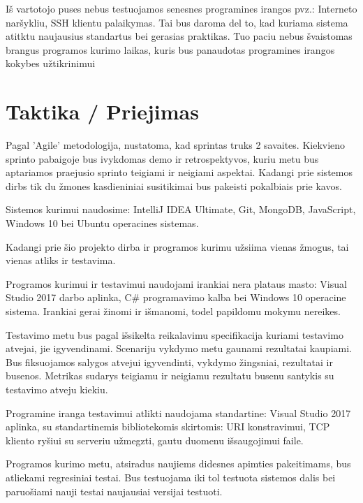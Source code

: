 \documentclass{VUMIFPSkursinis}
\begin{document}
Iš vartotojo puses nebus testuojamos senesnes programines irangos pvz.: Interneto naršykliu, SSH klientu palaikymas.
Tai bus daroma del to, kad kuriama sistema atitktu naujausius standartus bei gerasias praktikas.
Tuo paciu nebus švaistomas brangus programos kurimo laikas, kuris bus panaudotas programines irangos kokybes užtikrinimui


\section{Taktika / Priejimas}

Pagal 'Agile' metodologija, nustatoma, kad sprintas truks 2 savaites.
Kiekvieno sprinto pabaigoje bus ivykdomas demo ir retrospektyvos,
kuriu metu bus aptariamos praejusio sprinto teigiami ir neigiami aspektai.
Kadangi prie sistemos dirbs tik du žmones kasdieniniai susitikimai bus pakeisti pokalbiais prie kavos.

Sistemos kurimui naudosime: IntelliJ IDEA Ultimate, Git, MongoDB, JavaScript, Windows 10 bei Ubuntu operacines sistemas.













Kadangi prie šio projekto dirba ir programos kurimu užsiima vienas žmogus, tai vienas atliks ir testavima.

Programos kurimui ir testavimui naudojami irankiai nera plataus masto: Visual Studio 2017 darbo aplinka, C\# programavimo kalba bei Windows 10 operacine sistema. 
Irankiai gerai žinomi ir išmanomi, todel papildomu mokymu nereikes. 

Testavimo metu bus pagal išsikelta reikalavimu specifikacija kuriami testavimo atvejai, jie igyvendinami. 
Scenariju vykdymo metu gaunami rezultatai kaupiami. 
Bus fiksuojamos salygos atvejui igyvendinti, vykdymo žingsniai, rezultatai ir busenos. 
Metrikas sudarys teigiamu ir neigiamu rezultatu busenu santykis su testavimo atveju kiekiu. 

Programine iranga testavimui atlikti naudojama standartine: Visual Studio 2017 aplinka, su standartinemis bibliotekomis skirtomis: URI konstravimui, TCP kliento ryšiui su serveriu užmegzti, gautu duomenu išsaugojimui faile. 

Programos kurimo metu, atsiradus naujiems didesnes apimties pakeitimams, bus atliekami regresiniai testai. 
Bus testuojama iki tol testuota sistemos dalis bei paruošiami nauji testai naujausiai versijai testuoti. 
\end{document}
